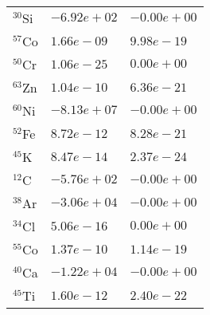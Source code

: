 \begin{tabular}{lll}
 $^{30}$Si & $-6.92e+02 $                                                       & $-0.00e+00 $                                                                    \\
 $^{57}$Co & $1.66e-09 $                                                        & $9.98e-19 $                                                                     \\
 $^{50}$Cr & $1.06e-25 $                                                        & $0.00e+00 $                                                                     \\
 $^{63}$Zn & $1.04e-10 $                                                        & $6.36e-21 $                                                                     \\
 $^{60}$Ni & $-8.13e+07 $                                                       & $-0.00e+00 $                                                                    \\
 $^{52}$Fe & $8.72e-12 $                                                        & $8.28e-21 $                                                                     \\
 $^{45}$K  & $8.47e-14 $                                                        & $2.37e-24 $                                                                     \\
 $^{12}$C  & $-5.76e+02 $                                                       & $-0.00e+00 $                                                                    \\
 $^{38}$Ar & $-3.06e+04 $                                                       & $-0.00e+00 $                                                                    \\
 $^{34}$Cl & $5.06e-16 $                                                        & $0.00e+00 $                                                                     \\
 $^{55}$Co & $1.37e-10 $                                                        & $1.14e-19 $                                                                     \\
 $^{40}$Ca & $-1.22e+04 $                                                       & $-0.00e+00 $                                                                    \\
 $^{45}$Ti & $1.60e-12 $                                                        & $2.40e-22 $                                                                     \\

\end{tabular}
